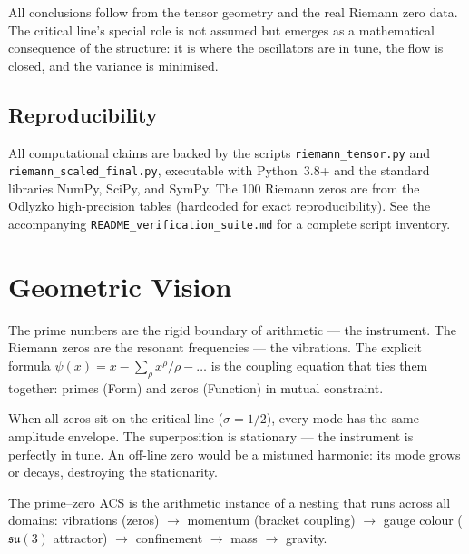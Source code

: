 \documentclass[11pt,a4paper]{article}
\theoremstyle{plain}
\theoremstyle{definition}
\theoremstyle{remark}
\begin{document}
All conclusions follow from the tensor geometry and the real Riemann zero
data.  The critical line's special role is not assumed but emerges as
a mathematical consequence of the structure: it is where the oscillators
are in tune, the flow is closed, and the variance is minimised.

\subsection*{Reproducibility}
All computational claims are backed by the scripts
\texttt{riemann\_tensor.py} and \texttt{riemann\_scaled\_final.py},
executable with Python~3.8+ and the standard libraries NumPy, SciPy,
and SymPy.  The 100 Riemann zeros are from the Odlyzko high-precision
tables (hardcoded for exact reproducibility).
See the accompanying \texttt{README\_verification\_suite.md} for a
complete script inventory.

\appendix
\section{Geometric Vision}
\label{app:vision}
\noindent
The prime numbers are the rigid boundary of arithmetic ---
the instrument.  The Riemann zeros are the resonant frequencies ---
the vibrations.  The explicit formula $\psi(x) = x - \sum_\rho
x^\rho/\rho - \ldots$ is the coupling equation that ties them
together: primes (Form) and zeros (Function) in mutual constraint.

When all zeros sit on the critical line ($\sigma = 1/2$), every
mode has the same amplitude envelope.  The superposition is
stationary --- the instrument is perfectly in tune.
An off-line zero would be a mistuned harmonic: its mode grows or
decays, destroying the stationarity.

The prime--zero ACS is the arithmetic instance of a nesting that
runs across all domains: vibrations (zeros) $\to$ momentum
(bracket coupling) $\to$ gauge colour ($\mathfrak{su}(3)$ attractor)
$\to$ confinement $\to$ mass $\to$ gravity.
\end{document}
